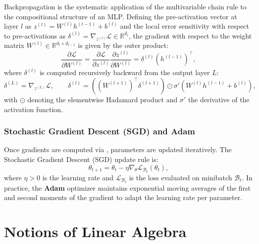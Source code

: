 \documentclass[11pt, oneside, openany]{book}
\begin{document}
Backpropagation \cite{rumelhart1986learning} is the systematic application of the multivariable chain rule to the compositional structure of an MLP. Defining the pre-activation vector at layer $l$ as $z^{(l)} = W^{(l)} h^{(l-1)} + b^{(l)}$ and the local error sensitivity with respect to pre-activations as $\delta^{(l)} = \nabla_{z^{(l)}} \mathcal{L} \in \mathbb{R}^{d_{l}}$, the gradient with respect to the weight matrix $W^{(l)} \in \mathbb{R}^{d_{l} \times d_{l-1}}$ is given by the outer product:
\begin{equation}
\label{eq:A.6}
\frac{\partial \mathcal{L}}{\partial W^{(l)}} = \frac{\partial \mathcal{L}}{\partial z^{(l)}} \frac{\partial z^{(l)}}{\partial W^{(l)}} = \delta^{(l)} \left(h^{(l-1)}\right)^{\top},
\end{equation}
where $\delta^{(l)}$ is computed recursively backward from the output layer $L$:
\begin{equation}
\label{eq:A.7}
\delta^{(L)} = \nabla_{z^{(L)}} \mathcal{L}, \qquad \delta^{(l)} = \left( (W^{(l+1)})^{\top} \delta^{(l+1)} \right) \odot \sigma'\left(W^{(l)} h^{(l-1)} + b^{(l)}\right),
\end{equation}
with $\odot$ denoting the elementwise Hadamard product and $\sigma'$ the derivative of the activation function.

\subsection{Stochastic Gradient Descent (SGD) and Adam}
\label{sec:A.3.2}

Once gradients are computed via , parameters are updated iteratively. The Stochastic Gradient Descent (SGD) update rule is:
\begin{equation}
\label{eq:A.8}
\theta_{t+1} = \theta_{t} - \eta \nabla_{\theta} \mathcal{L}_{\mathcal{B}_{t}}(\theta_{t}),
\end{equation}
where $\eta > 0$ is the learning rate and $\mathcal{L}_{\mathcal{B}_{t}}$ is the loss evaluated on minibatch $\mathcal{B}_{t}$. In practice, the \textbf{Adam} optimizer \cite{goodfellow2016deep} maintains exponential moving averages of the first and second moments of the gradient to adapt the learning rate per parameter.

\chapter{Notions of Linear Algebra}
\label{app:B}
\end{document}
